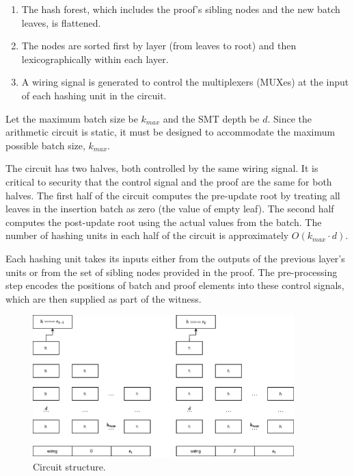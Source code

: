 \documentclass[twocolumn]{article}
\begin{document}
\begin{enumerate}
    \item The hash forest, which includes the proof's sibling nodes and the new batch leaves, is flattened.
    \item The nodes are sorted first by layer (from leaves to root) and then lexicographically within each layer.
    \item A wiring signal is generated to control the multiplexers (MUXes) at the input of each hashing unit in the circuit.
\end{enumerate}

Let the maximum batch size be $k_{max}$ and the SMT depth be $d$. Since the arithmetic circuit is static, it must be designed to accommodate the maximum possible batch size, $k_{max}$.

The circuit has two halves, both controlled by the same wiring signal. It is critical to security that the control signal and the proof are the same for both halves. The first half of the circuit computes the pre-update root by treating all leaves in the insertion batch as zero (the value of empty leaf). The second half computes the post-update root using the actual values from the batch. The number of hashing units in each half of the circuit is approximately $O(k_{max} \cdot d)$.

Each hashing unit takes its inputs either from the outputs of the previous layer's units or from the set of sibling nodes provided in the proof. The pre-processing step encodes the positions of batch and proof elements into these control signals, which are then supplied as part of the witness.

\begin{figure}[!t]
    \centering
    \includegraphics[width=0.9\textwidth]{pic/smt-circuit.drawio}
    \caption{Circuit structure.}\label{fi:smt-circuit}
\end{figure}
\end{document}
